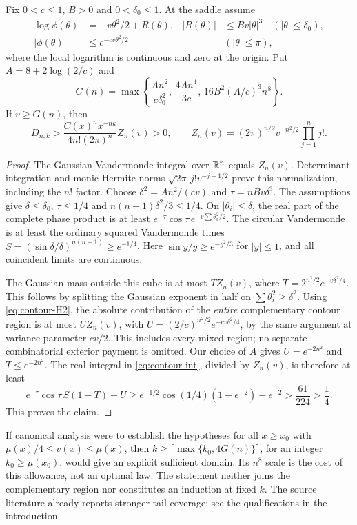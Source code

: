 \begin{proposition}\label{prop:contour}
Fix $0<c\le1$, $B>0$ and $0<\delta_0\le1$. At the saddle assume
\begin{align}
 \log\phi(\theta)&=-v\theta^2/2+R(\theta),&
 |R(\theta)|&\le Bv|\theta|^3\quad(|\theta|\le\delta_0),\label{eq:contour-H1}\\
 |\phi(\theta)|&\le e^{-cv\theta^2/2}&&(|\theta|\le\pi),\label{eq:contour-H2}
\end{align}
where the local logarithm is continuous and zero at the origin.
Put $A=8+2\log(2/c)$ and
\[
 G(n)=\max\left\{\frac{An^2}{c\delta_0^2},\,
 \frac{4An^4}{3c},\,16B^2(A/c)^3n^8\right\}.
\]
If $v\ge G(n)$, then
\begin{equation}\label{eq:contour-margin}
 D_{n,k}>\frac{C(x)^nx^{-nk}}{4n!(2\pi)^n}Z_n(v)>0,
 \qquad Z_n(v)=(2\pi)^{n/2}v^{-n^2/2}\prod_{j=1}^n j!.
\end{equation}
\end{proposition}
\begin{proof}
The Gaussian Vandermonde integral over $\mathbb R^n$ equals $Z_n(v)$.
Determinant integration and monic Hermite norms
$\sqrt{2\pi}\,j!v^{-j-1/2}$ prove this normalization, including the
$n!$ factor. Choose $\delta^2=An^2/(cv)$ and
$\tau=nBv\delta^3$. The assumptions give
$\delta\le\delta_0$, $\tau\le1/4$ and
$n(n-1)\delta^2/3\le1/4$. On $|\theta_i|\le\delta$, the real part
of the complete phase product is at least
$e^{-\tau}\cos\tau\,e^{-v\sum\theta_i^2/2}$.
The circular Vandermonde is at least the ordinary squared Vandermonde
times $S=(\sin\delta/\delta)^{n(n-1)}\ge e^{-1/4}$.
Here $\sin y/y\ge e^{-y^2/3}$ for $|y|\le1$, and all coincident
limits are continuous.

The Gaussian mass outside this cube is at most $TZ_n(v)$, where
$T=2^{n^2/2}e^{-v\delta^2/4}$. This follows by splitting the
Gaussian exponent in half on $\sum\theta_i^2\ge\delta^2$.
Using \eqref{eq:contour-H2}, the absolute contribution of the
\emph{entire} complementary contour region is at most $UZ_n(v)$, with
$U=(2/c)^{n^2/2}e^{-cv\delta^2/4}$, by the same argument at
variance parameter $cv/2$. This includes every mixed region; no
separate combinatorial exterior payment is omitted.
Our choice of $A$ gives $U=e^{-2n^2}$ and $T\le e^{-2n^2}$.
The real integral in \eqref{eq:contour-int}, divided by $Z_n(v)$, is
therefore at least
\[
 e^{-\tau}\cos\tau\,S(1-T)-U
 \ge e^{-1/2}\cos(1/4)(1-e^{-2})-e^{-2}
 >\frac{61}{224}>\frac14.
\]
This proves the claim.
\end{proof}

If canonical analysis were to establish the hypotheses for all $x\ge x_0$
with $\mu(x)/4\le v(x)\le\mu(x)$, then
$k\ge\lceil\max\{k_0,4G(n)\}\rceil$, for an integer
$k_0\ge\mu(x_0)$, would give an explicit sufficient domain.
Its $n^8$ scale is the cost of this allowance, not an optimal law.
The statement neither joins the complementary region nor constitutes
an induction at fixed $k$. The source literature already reports
stronger tail coverage; see the qualifications in the introduction.
